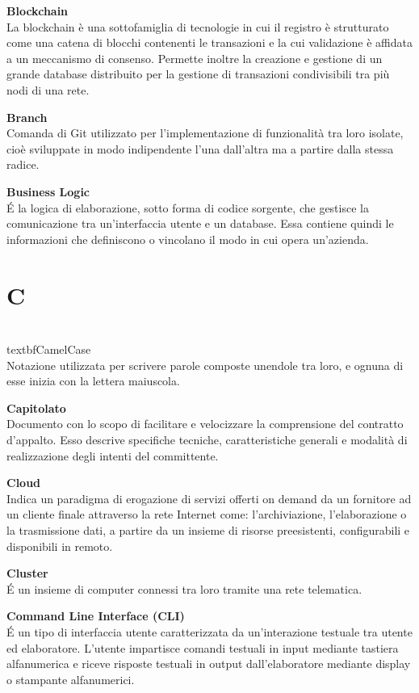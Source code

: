 \documentclass[a4paper, oneside, openany, dvipsnames, table, 12pt]{article}
\begin{document}
\label{par:blockC}
\textbf{Blockchain} \\
La blockchain è una sottofamiglia di tecnologie in cui il registro è strutturato come una catena di blocchi contenenti le transazioni e la cui validazione è affidata a un meccanismo di consenso. 
Permette inoltre la creazione e gestione di un grande database distribuito per la gestione di transazioni condivisibili tra più nodi di una rete. 

\textbf{Branch} \\
Comanda di Git utilizzato per l’implementazione di funzionalità tra loro isolate, cioè sviluppate in modo indipendente l’una dall’altra ma a partire dalla stessa radice.

\textbf{Business Logic} \\
\'E la logica di elaborazione, sotto forma di codice sorgente, che gestisce la comunicazione tra un'interfaccia utente e un database.
Essa contiene quindi le informazioni che definiscono o vincolano il modo in cui opera un'azienda.



\newpage
\section{C}

\\textbf{CamelCase} \\
Notazione utilizzata per scrivere parole composte unendole tra loro, e ognuna di esse inizia con la lettera maiuscola.

\textbf{Capitolato}\\	
Documento con lo scopo di facilitare e velocizzare la comprensione del contratto d'appalto. Esso descrive specifiche tecniche, caratteristiche generali e modalità di realizzazione degli intenti del committente.

\textbf{Cloud} \\
Indica un paradigma di erogazione di servizi offerti on demand da un fornitore ad un cliente finale attraverso la rete Internet come: l'archiviazione, l'elaborazione o la trasmissione dati, a partire da un insieme di risorse preesistenti, configurabili e disponibili in remoto.

\textbf{Cluster} \\
\'E un insieme di computer connessi tra loro tramite una rete telematica.

\textbf{Command Line Interface (CLI)} \\
\'E un tipo di interfaccia utente caratterizzata da un'interazione testuale tra utente ed elaboratore. L'utente impartisce comandi testuali in input mediante tastiera alfanumerica e riceve risposte testuali in output dall'elaboratore mediante display o stampante alfanumerici. 
\end{document}
